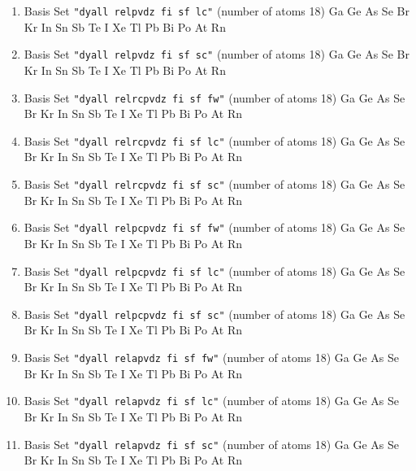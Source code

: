 \begin{enumerate}
\item Basis Set \verb#"dyall relpvdz fi sf lc"# (number of atoms 18)  \newline 
  Ga Ge As Se Br Kr In Sn Sb Te I Xe Tl Pb Bi Po At Rn


\item Basis Set \verb#"dyall relpvdz fi sf sc"# (number of atoms 18)  \newline 
  Ga Ge As Se Br Kr In Sn Sb Te I Xe Tl Pb Bi Po At Rn


\item Basis Set \verb#"dyall relrcpvdz fi sf fw"# (number of atoms 18)  \newline 
  Ga Ge As Se Br Kr In Sn Sb Te I Xe Tl Pb Bi Po At Rn


\item Basis Set \verb#"dyall relrcpvdz fi sf lc"# (number of atoms 18)  \newline 
  Ga Ge As Se Br Kr In Sn Sb Te I Xe Tl Pb Bi Po At Rn


\item Basis Set \verb#"dyall relrcpvdz fi sf sc"# (number of atoms 18)  \newline 
  Ga Ge As Se Br Kr In Sn Sb Te I Xe Tl Pb Bi Po At Rn


\item Basis Set \verb#"dyall relpcpvdz fi sf fw"# (number of atoms 18)  \newline 
  Ga Ge As Se Br Kr In Sn Sb Te I Xe Tl Pb Bi Po At Rn


\item Basis Set \verb#"dyall relpcpvdz fi sf lc"# (number of atoms 18)  \newline 
  Ga Ge As Se Br Kr In Sn Sb Te I Xe Tl Pb Bi Po At Rn


\item Basis Set \verb#"dyall relpcpvdz fi sf sc"# (number of atoms 18)  \newline 
  Ga Ge As Se Br Kr In Sn Sb Te I Xe Tl Pb Bi Po At Rn


\item Basis Set \verb#"dyall relapvdz fi sf fw"# (number of atoms 18)  \newline 
  Ga Ge As Se Br Kr In Sn Sb Te I Xe Tl Pb Bi Po At Rn


\item Basis Set \verb#"dyall relapvdz fi sf lc"# (number of atoms 18)  \newline 
  Ga Ge As Se Br Kr In Sn Sb Te I Xe Tl Pb Bi Po At Rn


\item Basis Set \verb#"dyall relapvdz fi sf sc"# (number of atoms 18)  \newline 
  Ga Ge As Se Br Kr In Sn Sb Te I Xe Tl Pb Bi Po At Rn



\end{enumerate}
